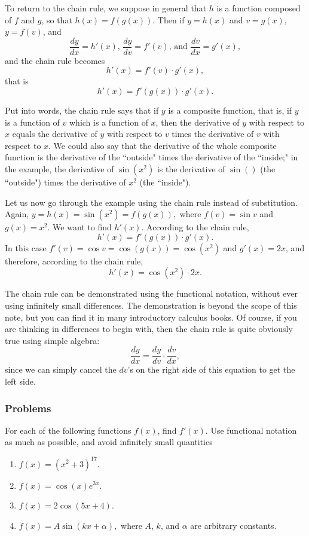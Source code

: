 \documentclass[polutonikogreek,english,twoside,openright]{article}
\begin{document}
To return to the chain rule, we suppose in general that $h$ is a function composed of $f$ and $g$, so that $h(x) = f(g(x))$.  Then if $y= h(x)$ and $v= g(x)$, $y = f(v)$, and 
$$\frac{dy}{dx} = h'(x)\mbox{, } \frac{dy}{dv} = f'(v)\mbox{, and } \frac{dv}{dx} = g'(x),$$
and the chain rule becomes
$$h'(x) = f'(v)\cdot g'(x),$$
that is
$$h'(x) = f'(g(x))\cdot g'(x).$$

Put into words, the chain rule says that if $y$ is a composite
function, that is, if $y$ is a function of $v$ which is a function of
$x$, then the derivative of $y$ with respect to $x$ equals the
derivative of $y$ with respect to $v$ times the derivative of $v$ with
respect to $x$.  We could also say that the derivative of the whole
composite function is the derivative of the ``outside" times the
derivative of the ``inside;" in the example, the derivative of
$\sin(x^2)$ is the derivative of $\sin()$ (the ``outside") times the
derivative of $x^2$ (the ``inside").

Let us now go through the example using the chain rule instead of
substitution. Again, $y = h(x) = \sin (x^2) = f(g(x)),$ where $f(v) = \sin v$ and $g(x) = x^2$. We want to find $h'(x).$   According to the chain rule,
$$h'(x) = f'(g(x))\cdot g'(x).$$
In this case $f'(v) = \cos v = \cos (g(x)) = \cos (x^2)$ and $g'(x) = 2x$, and 
therefore, according to the chain rule,
$$h'(x) = \cos (x^2) \cdot 2x.$$

The chain rule can be demonstrated using the functional notation,
without ever using infinitely small differences.  The demonstration is
beyond the scope of this note, but you can find it in many introductory
calculus books.  Of course, if you are thinking in differences to
begin with, then the chain rule is quite obviously true using simple
algebra:
$$\frac{dy}{dx} = \frac{dy}{dv}\cdot \frac{dv}{dx},$$
since we can simply cancel the $dv$'s on the right side of this
equation to get the left side.

\subsubsection*{Problems}
For each of the following functions $f(x)$, find $f'(x)$.  Use
functional notation as much as possible, and avoid infinitely small
quantities
\begin{enumerate}
\itemsep0em
  \setcounter{enumi}{1}
\item $f(x) = (x^2 + 3)^{17}.$
\item $f(x) = \cos(x)e^{3x}.$
\item $f(x) = 2\cos(5x + 4).$
\item $f(x) = A\sin(kx + \alpha),$ where $A$, $k$, and $\alpha$ are
  arbitrary constants.
\end{enumerate}\label{chainruleend}
\end{document}
